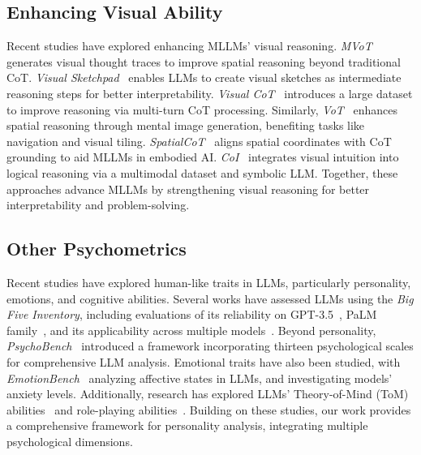 \subsection{Enhancing Visual Ability}

Recent studies have explored enhancing MLLMs' visual reasoning.
\textit{MVoT}~\cite{li2025imagine} generates visual thought traces to improve spatial reasoning beyond traditional CoT.
\textit{Visual Sketchpad}~\cite{hu2024visual} enables LLMs to create visual sketches as intermediate reasoning steps for better interpretability.
\textit{Visual CoT}~\cite{shao2024visual} introduces a large dataset to improve reasoning via multi-turn CoT processing.
Similarly, \textit{VoT}~\cite{wu2024visualization} enhances spatial reasoning through mental image generation, benefiting tasks like navigation and visual tiling.
\textit{SpatialCoT}~\cite{liu2025spatialcot} aligns spatial coordinates with CoT grounding to aid MLLMs in embodied AI.
\textit{CoI}~\cite{meng2023chain} integrates visual intuition into logical reasoning via a multimodal dataset and symbolic LLM.
Together, these approaches advance MLLMs by strengthening visual reasoning for better interpretability and problem-solving.

\subsection{Other Psychometrics}

Recent studies have explored human-like traits in LLMs, particularly personality, emotions, and cognitive abilities.
Several works have assessed LLMs using the \textit{Big Five Inventory}, including evaluations of its reliability on GPT-3.5~\cite{huang2024reliability}, PaLM family~\cite{serapio2023personality}, and its applicability across multiple models~\cite{jiang2023evaluating}.
Beyond personality, \textit{PsychoBench}~\cite{huang2024humanity} introduced a framework incorporating thirteen psychological scales for comprehensive LLM analysis.
Emotional traits have also been studied, with \textit{EmotionBench}~\cite{huang2024apathetic} analyzing affective states in LLMs, and \citet{coda2023inducing} investigating models' anxiety levels.
Additionally, research has explored LLMs' Theory-of-Mind (ToM) abilities~\cite{liu2024interintent, liang2023leveraging, huang2025competing} and role-playing abilities~\cite{ng2024well, wang2024incharacter, wang2025coser}.
Building on these studies, our work provides a comprehensive framework for personality analysis, integrating multiple psychological dimensions.